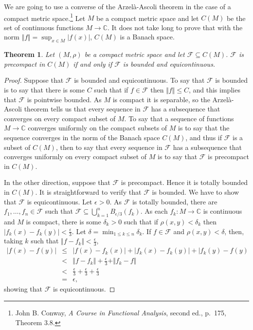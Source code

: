 \documentclass{article}
\newcommand{\norm}[1]{\Vert #1 \Vert}
\newtheorem{theorem}{Theorem}
\begin{document}
We are going to use a converse of
the Arzel\`a-Ascoli theorem in the case of a compact metric space.\footnote{John B. Conway, {\em A Course in Functional Analysis}, second ed.,
p.~175, Theorem 3.8.}
Let $M$ be a compact metric space and let $C(M)$ be the set of continuous functions $M \to \mathbb{C}$.
It does not take long to prove that with the norm $\norm{f} = \sup_{x \in M} |f(x)|$, $C(M)$ is a Banach space. 

\begin{theorem}
Let $(M,\rho)$ be a compact metric space and let $\mathcal{F} \subseteq C(M)$. $\mathcal{F}$ is precompact
in $C(M)$ if and only if $\mathcal{F}$ is bounded and equicontinuous.
\label{ascoli}
\end{theorem}
\begin{proof}
Suppose that $\mathcal{F}$ is bounded and equicontinuous. To say that $\mathcal{F}$ is bounded is to say that there is some $C$ such that if $f \in \mathcal{F}$ then $\norm{f} \leq C$, and this implies that
$\mathcal{F}$ is pointwise bounded. As $M$ is compact it is separable, so the Arzel\`a-Ascoli theorem tells us that every sequence in $\mathcal{F}$ has a subsequence
that converges on every compact subset of $M$.
To say that a sequence of functions $M \to \mathbb{C}$ converges uniformly on the compact subsets of $M$ is to say that
the sequence converges in the norm of the Banach space $C(M)$, and thus if $\mathcal{F}$ is a subset of $C(M)$, then to say that every sequence in
$\mathcal{F}$ has a subsequence that converges uniformly on every compact subset of $M$ is to say that $\mathcal{F}$ is precompact in $C(M)$.

In the other direction,
suppose that $\mathcal{F}$ is precompact. Hence it is totally bounded in $C(M)$. It is straightforward to verify that $\mathcal{F}$ is bounded.
We have
to show that $\mathcal{F}$ is equicontinuous. Let $\epsilon>0$. As $\mathcal{F}$ is totally bounded, there are $f_1,\ldots,f_n \in \mathcal{F}$ such that
$\mathcal{F} \subseteq \bigcup_{k=1}^n B_{\epsilon/3}(f_k)$. 
As each $f_k:M \to \mathbb{C}$ is continuous and $M$ is compact, there is some $\delta_k>0$ such that if $\rho(x,y)<\delta_k$ then $|f_k(x)-f_k(y)|<\frac{\epsilon}{3}$.
Let $\delta=\min_{1 \leq k \leq n} \delta_k$.
If $f \in \mathcal{F}$ and $\rho(x,y)<\delta$, then, taking $k$ such that $\norm{f-f_k} < \frac{\epsilon}{3}$,
\begin{eqnarray*}
|f(x)-f(y)| &\leq& |f(x)-f_k(x)| + |f_k(x)-f_k(y)| + |f_k(y)-f(y)\\
&<&\norm{f-f_k} + \frac{\epsilon}{3} + \norm{f_k-f}\\
&<&\frac{\epsilon}{3} + \frac{\epsilon}{3} + \frac{\epsilon}{3}\\
&=&\epsilon,
\end{eqnarray*}
showing that $\mathcal{F}$ is equicontinuous.
\end{proof}
\end{document}
